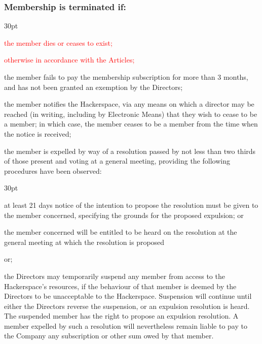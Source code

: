 \documentclass[12pt]{article}
\def\clauseindent{30pt}
\newenvironment{subindentpara}{\begin{adjustwidth}{\clauseindent}{}\begin{hanginglist}}{\end{hanginglist}\end{adjustwidth}}
\begin{document}
\subsubsection{Membership is terminated if:}
\begin{subindentpara}
    \item \textcolor{red}{the member dies or ceases to exist;}
    \item \textcolor{red}{otherwise in accordance with the Articles;}
    \item the member fails to pay the membership subscription for more than 3 months, and has not been granted an exemption by the Directors;
    \item the member notifies the Hackerspace, via any means on which a director may be reached (in writing, including by Electronic Means) that they wish to cease to be a member; in which case, the member ceases to be a member from the time when the notice is received;
    \item the member is expelled by way of a resolution passed by not less than two thirds of those present and voting at a general meeting, providing the following procedures have been observed: 
    \begin{subindentpara} %
        \item at least 21 days notice of the intention to propose the resolution must be given to the member concerned,  specifying the grounds for the proposed expulsion; or
        \item the member concerned will be entitled to be heard on the resolution at the general meeting at which the resolution is proposed
    \end{subindentpara}
    \item or;
    \item the Directors may temporarily suspend any member from access to the Hackerspace's resources, if the behaviour of that member is deemed by the Directors to be unacceptable to the Hackerspace. Suspension will continue until either the Directors reverse the suspension, or an expulsion resolution is heard. The suspended member has the right to propose an expulsion resolution. A member expelled by such a resolution will nevertheless remain liable to pay to the Company any subscription or other sum owed by that member.
\end{subindentpara}
\end{document}
